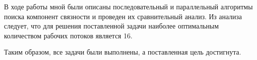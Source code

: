 
В ходе работы мной были описаны последовательный и параллельный алгоритмы поиска компонент связности и проведен их сравнительный анализ. Из анализа следует, что для решения поставленной задачи наиболее оптимальным количеством рабочих потоков является 16.

Таким образом, все задачи были выполнены, а поставленная цель достигнута.